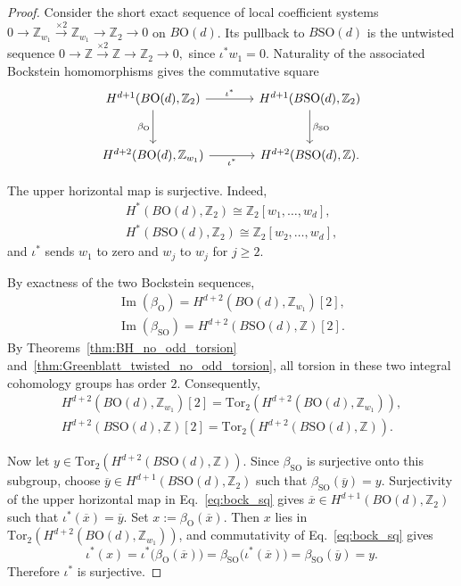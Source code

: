 \documentclass[aps,prx,reprint,superscriptaddress,twocolumn,amsmath,amssymb,amsfonts, nofootinbib]{revtex4-2}
\newcommand{\SO}{\text{SO}}
\newcommand{\tor}{\text{Tor}}
\newcommand{\Z}{\mathbb{Z}}
\theoremstyle{apsstyle}
\begin{document}
\begin{proof}
Consider the short exact sequence of local coefficient systems $
0 \to \Z_{w_1} \xrightarrow{\times 2} \Z_{w_1} \to \Z_2 \to 0$ on $B\mathrm O(d)$. Its pullback to $B\SO(d)$ is the untwisted sequence $0 \to \Z \xrightarrow{\times 2} \Z \to \Z_2 \to 0,
$ since $\iota^*w_1=0$. Naturality of the associated Bockstein homomorphisms gives the commutative square
\begin{equation}
\label{eq:bock_sq}
\begin{tikzcd}[column sep=large,row sep=large]
H^{d+1}(B\mathrm O(d),\Z_2)
\arrow[r,"\iota^*"]
\arrow[d,"\beta_{\mathrm O}"']
&
H^{d+1}(B\SO(d),\Z_2)
\arrow[d,"\beta_{\mathrm{SO}}"]
\\
H^{d+2}(B\mathrm O(d),\Z_{w_1})
\arrow[r,"\iota^*"']
&
H^{d+2}(B\SO(d),\Z).
\end{tikzcd}
\end{equation}

\noindent The upper horizontal map is surjective. Indeed,
\begin{gather*}
H^*(B\mathrm O(d),\Z_2)
\cong \Z_2[w_1,\ldots,w_d],\\
H^*(B\SO(d),\Z_2)
\cong \Z_2[w_2,\ldots,w_d],
\end{gather*}
and $\iota^*$ sends $w_1$ to zero and $w_j$ to $w_j$ for $j\geq2$.

\bigskip 

\noindent By exactness of the two Bockstein sequences,
\begin{gather*}
\operatorname{Im}(\beta_{\mathrm O})
= H^{d+2}(B\mathrm O(d),\Z_{w_1})[2],\\
\operatorname{Im}(\beta_{\mathrm{SO}})
= H^{d+2}(B\SO(d),\Z)[2].
\end{gather*}
By Theorems~\ref{thm:BH_no_odd_torsion} and~\ref{thm:Greenblatt_twisted_no_odd_torsion}, all torsion in these two integral cohomology groups has order $2$. Consequently,
\begin{gather*}
H^{d+2}(B\mathrm O(d),\Z_{w_1})[2]
= \tor_2\left( H^{d+2}(B\mathrm O(d),\Z_{w_1}) \right),\\
H^{d+2}(B\SO(d),\Z)[2] =
\tor_2\left( H^{d+2}(B\SO(d),\Z) \right).
\end{gather*}

\bigskip 

\noindent Now let $y\in \tor_2\left( H^{d+2}(B\SO(d),\Z) \right)$. Since $\beta_{\mathrm{SO}}$ is surjective onto this subgroup, choose $\overline y\in H^{d+1}(B\SO(d),\Z_2)$ such that $\beta_{\mathrm{SO}}(\overline y)=y$. Surjectivity of the upper horizontal map in Eq.~\eqref{eq:bock_sq} gives $\overline x\in H^{d+1}(B\mathrm O(d),\Z_2)$ such that $\iota^*(\overline x)=\overline y$. Set
$x:=\beta_{\mathrm O}(\overline x)$. Then $x$ lies in
$\tor_2(H^{d+2}(B\mathrm O(d),\Z_{w_1}))$, and commutativity of
Eq.~\eqref{eq:bock_sq} gives
\begin{equation*}
\iota^*(x)
= \iota^*\bigl(\beta_{\mathrm O}(\overline x)\bigr)
= \beta_{\mathrm{SO}}\bigl(\iota^*(\overline x)\bigr)
= \beta_{\mathrm{SO}}(\overline y) = y.
\end{equation*}
Therefore $\iota^*$ is surjective.
\end{proof}
\end{document}
